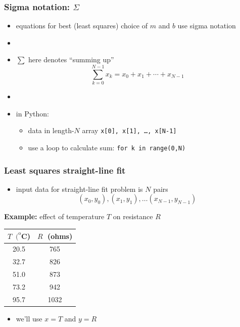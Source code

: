 \documentclass[english,14pt]{beamer}
\newcommand\red[1]{{\color{red} #1}}
\begin{document}

\begin{frame}[fragile]

\frametitle{Sigma notation: $\Sigma$}

\begin{itemize}
	\item equations for best (least squares) choice of $m$ and $b$ use \red{sigma notation}
	\item[]
	\item $\sum$ here denotes ``summing up''
	\[
		\sum_{k=0}^{N-1} x_k = x_0 + x_1 + \cdots + x_{N-1}
	\]
	\item[]
	\item in Python:
	\begin{itemize}
		\item data in length-$N$ array \texttt{x[0], x[1], \ldots, x[N-1]}
		\item use a loop to calculate sum: \texttt{for k in range(0,N)}
	\end{itemize}
\end{itemize}

\end{frame}


\begin{frame}[fragile]

\frametitle{Least squares straight-line fit}

\begin{itemize}
	\item input data for straight-line fit problem is $N$ pairs
\[
(x_0,y_0), (x_1,y_1), \ldots (x_{N-1},y_{N-1})
\]
\end{itemize}

\textbf{Example:} effect of temperature $T$ on resistance $R$

\begin{center}
 \begin{tabular}{c c} 
$T \;\; (^\mathrm{o}$C) & $R \;$ (ohms) \\
 \hline\hline
20.5 & 765 \\ 

32.7 & 826 \\

51.0 & 873 \\

73.2 & 942 \\

95.7 & 1032 
\end{tabular}
\end{center}

\begin{itemize}
	\item we'll use $x = T$ and $y = R$
\end{itemize}

\end{frame}
\end{document}

